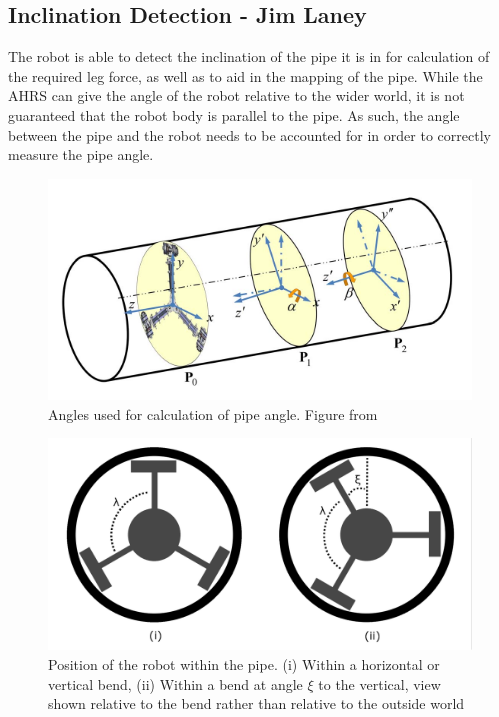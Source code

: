 \documentclass[11pt]{article}		%
\newlength{\imageheight}	 %
\begin{document}
		\subsection[Inclination Detection]{Inclination Detection - Jim Laney}
		
		The robot is able to detect the inclination of the pipe it is in for calculation of the required leg force, as well as to aid in the mapping of the pipe.
		While the AHRS can give the angle of the robot relative to the wider world, it is not guaranteed that the robot body is parallel to the pipe.
		As such, the angle between the pipe and the robot needs to be accounted for in order to correctly measure the pipe angle.
		\\
		\begin{figure}[h]
			\centering
			\includegraphics[height=\imageheight]{pipeOrientation}
			\caption{Angles used for calculation of pipe angle. Figure from \cite{park2010normal}}
			\label{pipeOrientation}
		\end{figure}
		\begin{figure}[h]
			\centering
			\includegraphics[height=\imageheight]{pipeAngle}
			\caption{Position of the robot within the pipe. (i) Within a horizontal or vertical bend, (ii) Within a bend at angle $\xi$ to the vertical, view shown relative to the bend rather than relative to the outside world}
			\label{pipeAngle}
		\end{figure}
\end{document}

